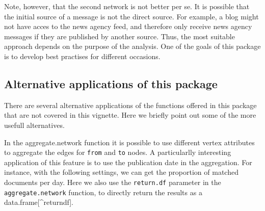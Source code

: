 \documentclass[]{article}
\newenvironment{Shaded}{\begin{snugshade}}{\end{snugshade}}
\newcommand{\KeywordTok}[1]{\textcolor[rgb]{0.13,0.29,0.53}{\textbf{{#1}}}}
\newcommand{\DataTypeTok}[1]{\textcolor[rgb]{0.13,0.29,0.53}{{#1}}}
\newcommand{\StringTok}[1]{\textcolor[rgb]{0.31,0.60,0.02}{{#1}}}
\newcommand{\NormalTok}[1]{{#1}}
\begin{document}
Note, however, that the second network is not better per se. It is
possible that the initial source of a message is not the direct source.
For example, a blog might not have acces to the news agency feed, and
therefore only receive news agency messages if they are published by
another source. Thus, the most suitable approach depends on the purpose
of the analysis. One of the goals of this package is to develop best
practises for different occasions.

\subsection{Alternative applications of this
package}\label{alternative-applications-of-this-package}

There are several alternative applications of the functions offered in
this package that are not covered in this vignette. Here we briefly
point out some of the more usefull alternatives.

In the aggregate.network function it is possible to use different vertex
attributes to aggregate the edges for \texttt{from} and \texttt{to}
nodes. A particularlly interesting application of this feature is to use
the publication date in the aggregation. For instance, with the
following settings, we can get the proportion of matched documents per
day. Here we also use the \texttt{return.df} parameter in the
\texttt{aggregate.network} function, to directly return the results as a
data.frame{[}\^{}returndf{]}.

\begin{Shaded}
\end{Shaded}
\end{document}
